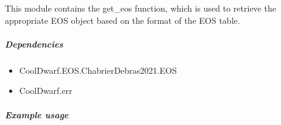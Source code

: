\documentclass[letterpaper,10pt,english]{sphinxmanual}
\begin{document}
\sphinxAtStartPar
This module contains the get\_eos function, which is used to retrieve the appropriate EOS object based on the format
of the EOS table.


\subparagraph{Dependencies}
\label{\detokenize{CoolDwarf.EOS:dependencies}}\begin{itemize}
\item {} 
\sphinxAtStartPar
CoolDwarf.EOS.ChabrierDebras2021.EOS

\item {} 
\sphinxAtStartPar
CoolDwarf.err

\end{itemize}


\subparagraph{Example usage}
\label{\detokenize{CoolDwarf.EOS:example-usage}}
\begin{sphinxVerbatim}[commandchars=\\\{\}]
   
   
\end{sphinxVerbatim}
\end{document}
